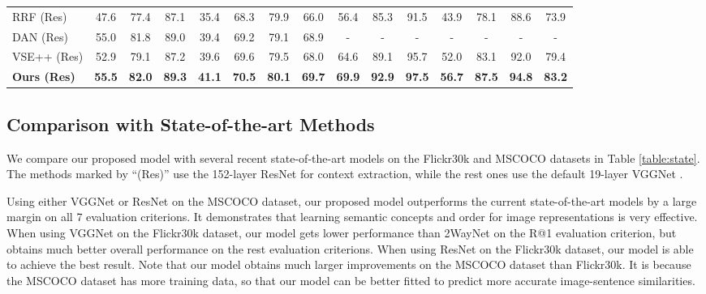 \documentclass[10pt,twocolumn,letterpaper]{article}
\begin{document}
\begin{table*}[t]
\begin{tabular}{l|ccc|ccc|c|ccc|ccc|c}
\hline
RRF (Res) \cite{Learning2017Liu}       &47.6 &77.4 &87.1  &35.4 &68.3 &79.9 & 66.0  &56.4 &85.3 &91.5 &43.9 &78.1 &88.6 &73.9\\
DAN (Res) \cite{nam2016dual}       &55.0 &81.8 &89.0 &39.4 &69.2 &79.1   & 68.9  &-  &-  &-  &-  &-  &-  &-  \\
VSE++ (Res) \cite{faghri2017vse++}      &52.9 &79.1  &87.2     &39.6 &69.6 &79.5  & 68.0   &64.6 &89.1  &95.7  &52.0 &83.1 &92.0  & 79.4\\
\textbf{Ours (Res)}                 &\bf{55.5} &\bf{82.0} &\bf{89.3}  &\bf{41.1} &\bf{70.5} &\bf{80.1}  &\bf{69.7}   &\bf{69.9} &\bf{92.9} &\bf{97.5} &\bf{56.7} &\bf{87.5} &\bf{94.8} &\bf{83.2}\\

\hline
\hline
\end{tabular}
\label{table:state}
\end{table*}









\subsection{Comparison with State-of-the-art Methods}

We compare our proposed model with several recent state-of-the-art models
on the Flickr30k and MSCOCO datasets in Table \ref{table:state}.
The methods marked by ``(Res)'' use the 152-layer ResNet \cite{he2016deep} for context extraction,
while the rest ones use the default 19-layer VGGNet \cite{simonyan2014very}.


Using either VGGNet or ResNet on the MSCOCO dataset,
our proposed model outperforms the current state-of-the-art
models by a large margin on all 7 evaluation criterions.
It demonstrates that learning semantic concepts and order
for image representations is very effective.
When using VGGNet on the Flickr30k dataset,
our model gets lower performance than 2WayNet on the R@1 evaluation criterion,
but obtains much better overall performance on the rest evaluation criterions.
When using ResNet on the Flickr30k dataset, our model is able to achieve the best result.
Note that our model obtains much larger improvements on the MSCOCO dataset than Flickr30k.
It is because the MSCOCO dataset has more training data,
so that our model can be better fitted
to predict more accurate image-sentence similarities.
\end{document}
